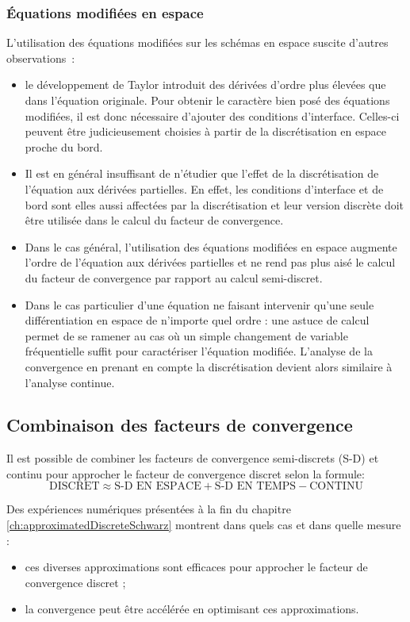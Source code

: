 \subsubsection*{Équations modifiées en espace}
L'utilisation des équations modifiées sur les schémas en espace
suscite d'autres observations~:
\begin{itemize}
	\item 
	le développement de Taylor introduit des dérivées
d'ordre plus élevées que dans l'équation originale. Pour
obtenir le caractère bien posé des équations modifiées, il est donc
nécessaire d'ajouter des conditions d'interface. Celles-ci peuvent
être judicieusement choisies à partir de la discrétisation en espace
proche du bord.
	\item Il est en général insuffisant de n'étudier que
		l'effet de la discrétisation de
		l'équation aux dérivées partielles. En effet,
		les conditions d'interface et de bord sont
		elles aussi affectées par la discrétisation et
		leur version discrète doit être utilisée
		dans le calcul du facteur de convergence.
	\item Dans le cas général, l'utilisation des équations
	modifiées en espace augmente l'ordre de l'équation aux
	dérivées partielles et ne rend pas plus aisé
	le calcul du facteur de convergence par rapport
		au calcul semi-discret.
	\item Dans le cas particulier d'une équation ne faisant
	intervenir
	qu'une seule différentiation en espace de n'importe
	quel ordre :
	une astuce de calcul permet de se ramener au cas où un simple
	changement de variable fréquentielle suffit pour caractériser
		l'équation modifiée.
	L'analyse de la convergence en prenant en compte la
		discrétisation devient alors similaire à l'analyse
		continue.
\end{itemize}
%
\subsection*{Combinaison des facteurs de convergence}
Il est possible de combiner les facteurs
de convergence semi-discrets (S-D) et continu pour approcher le
facteur de convergence discret selon la formule:
\begin{equation}
	\text{DISCRET} \approx
	\text{S-D EN ESPACE} +
	\text{S-D EN TEMPS} -
	\text{CONTINU}
\end{equation}
%
\par
Des expériences numériques présentées à la fin
du chapitre \ref{ch:approximatedDiscreteSchwarz} montrent dans quels
cas et dans quelle mesure :
\begin{itemize}
	\item
ces diverses approximations sont efficaces pour approcher le facteur
de convergence discret ;
	\item
la convergence
peut être accélérée en optimisant ces approximations.
\end{itemize}
